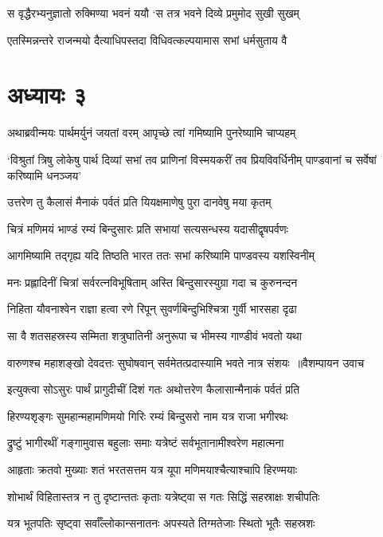 \twolineshloka
{स वृद्धैरभ्यनुज्ञातो रुक्मिण्या भवनं ययौ}
{`स तत्र भवने दिव्ये प्रमुमोद सुखी सुखम्}


\twolineshloka
{एतस्मिन्नन्तरे राजन्मयो दैत्याधिपस्तदा}
{विधिवत्कल्पयामास सभां धर्मसुताय वै}


\chapter{अध्यायः ३}
\twolineshloka
{अथाब्रवीन्मयः पार्थमर्युनं जयतां वरम्}
{आपृच्छे त्वां गमिष्यामि पुनरेष्यामि चाप्यहम्}


\threelineshloka
{`विश्रुतां त्रिषु लोकेषु पार्थ दिव्यां सभां तव}
{प्राणिनां विस्मयकरीं तव प्रियविवर्धिनीम्}
{पाण्डवानां च सर्वेषां करिष्यामि धनञ्जय'}


\twolineshloka
{उत्तरेण तु कैलासं मैनाकं पर्वतं प्रति}
{यियक्षमाणेषु पुरा दानवेषु मया कृतम्}


\twolineshloka
{चित्रं मणिमयं भाण्डं रम्यं बिन्दुसारः प्रति}
{सभायां सत्यसन्धस्य यदासीद्वृषपर्वणः}


\twolineshloka
{आगमिष्यामि तद्गृह्य यदि तिष्ठति भारत}
{ततः सभां करिष्यामि पाण्डवस्य यशस्विनीम्}


\twolineshloka
{मनः प्रह्लादिनीं चित्रां सर्वरत्नविभूषिताम्}
{अस्ति बिन्दुसारस्युग्रा गदा च कुरुनन्दन}


\twolineshloka
{निहिता यौवनाश्वेन राज्ञा हत्वा रणे रिपून्}
{सुवर्णबिन्दुभिश्चित्रा गुर्वी भारसहा दृढा}


\twolineshloka
{सा वै शतसहस्रस्य सम्मिता शत्रुघातिनी}
{अनुरूपा च भीमस्य गाण्डीवं भवतो यथा}


\threelineshloka
{वारुणश्च महाशङ्खो देवदत्तः सुघोषवान्}
{सर्वमेतत्प्रदास्यामि भवते नात्र संशयः ॥वैशम्पायन उवाच}
{}


\twolineshloka
{इत्युक्त्वा सोऽसुरः पार्थं प्रागुदीचीं दिशं गतः}
{अथोत्तरेण कैलासान्मैनाकं पर्वतं प्रति}


\twolineshloka
{हिरण्यशृङ्गः सुमहान्महामणिमयो गिरिः}
{रम्यं बिन्दुसरो नाम यत्र राजा भगीरथः}


\twolineshloka
{द्रुष्टुं भागीरथीं गङ्गामुवास बहुलाः समाः}
{यत्रेष्टं सर्वभूतानामीश्वरेण महात्मना}


\twolineshloka
{आहृताः क्रतवो मुख्याः शतं भरतसत्तम}
{यत्र यूपा मणिमयाश्चैत्याश्चापि हिरण्मयाः}


\twolineshloka
{शोभार्थं विहितास्तत्र न तु दृष्टान्ततः कृताः}
{यत्रेष्ट्वा स गतः सिद्धिं सहस्राक्षः शचीपतिः}


\twolineshloka
{यत्र भूतपतिः सृष्ट्वा सर्वाँल्लोकान्सनातनः}
{अपस्यते तिग्मतेजाः स्थितो भूतैः सहस्रशः}


